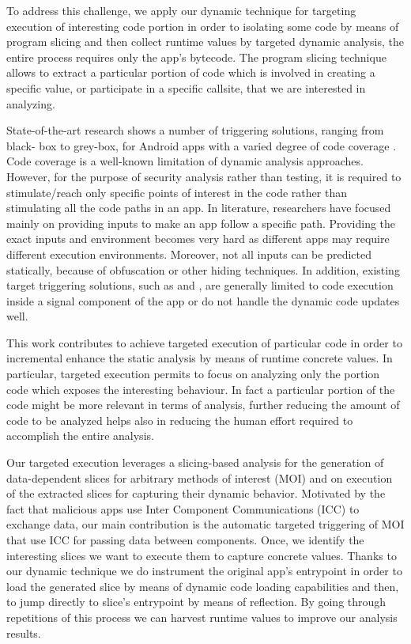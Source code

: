 To address this challenge, we apply our dynamic technique for targeting execution of interesting code portion in order to isolating some code by means of program slicing and then collect runtime values by targeted dynamic analysis, the entire process requires only the app's bytecode. The program slicing technique allows to extract a particular portion of code which is involved in creating a specific value, or participate in a specific callsite, that we are interested in analyzing. 

State-of-the-art research shows a number of triggering solutions, ranging from black- box to grey-box, for Android apps with a varied degree of code coverage \cite{mirzaei2012testing} \cite{rastogi2013appsplayground} \cite{zheng2012smartdroid} . Code coverage is a well-known limitation of dynamic analysis approaches. However, for the purpose of security analysis rather than testing, it is required to stimulate/reach only specific points of interest in the code rather than stimulating all the code paths in an app. In literature, researchers have focused mainly on providing inputs to make an app follow a specific path. Providing the exact inputs and environment becomes very hard as different apps may require different execution environments. Moreover, not all inputs can be predicted statically, because of obfuscation or other hiding techniques. In addition, existing target triggering solutions, such as \cite{rasthofer2016harvesting} and \cite{backes2016r}, are generally limited to code execution inside a signal component of the app or do not handle the dynamic code updates well.

This work contributes to achieve targeted execution of particular code in order to incremental enhance the static analysis by means of runtime concrete values. In particular, targeted execution permits to focus on analyzing only the portion code which exposes the interesting behaviour. In fact a particular portion of the code might be more relevant in terms of analysis, further reducing the amount of code to be analyzed helps also in reducing the human effort required to accomplish the entire analysis. 

Our targeted execution leverages a slicing-based analysis for the generation of data-dependent slices for arbitrary methods of interest (MOI) and on execution of the extracted slices for capturing their dynamic behavior. Motivated by the fact that malicious apps use Inter Component Communications (ICC) to exchange data, our main contribution is the automatic targeted triggering of MOI that use ICC for passing data between components. Once, we identify the interesting slices we want to execute them to capture concrete values. Thanks to our dynamic technique we do instrument the original app's entrypoint in order to load the generated slice by means of dynamic code loading capabilities and then, to jump directly to slice's entrypoint by means of reflection. By going through repetitions of this process we can harvest runtime values to improve our analysis results.

